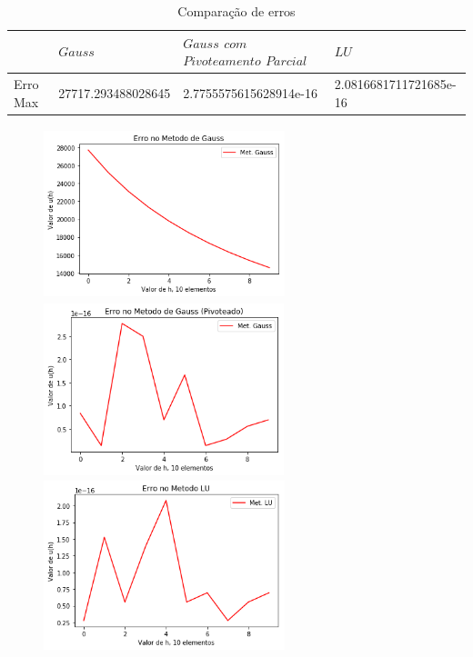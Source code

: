 \documentclass{article}
\begin{document}
\begin{table}[h]
\centering
  \begin{tabular}{l||l|l|l}
     & $ Gauss$ & $Gauss$ $com$ $Pivoteamento$ $Parcial$ & $LU$ \\
    \hline
    
    Erro Max & 27717.293488028645 & 2.7755575615628914e-16 & 2.0816681711721685e-16 \\
    
    
    \hline
  \end{tabular}
  \caption{Comparação de erros}
\end{table}

\begin{figure}[!htb]
\includegraphics[width=7cm,height=5cm]{EGauss10part.png}
\includegraphics [width=7cm,height=5cm]{EGaussP10part.png}
\includegraphics [width=7cm,height=5cm]{ELU10part.png}
\end{figure}



\newpage
\end{document}
